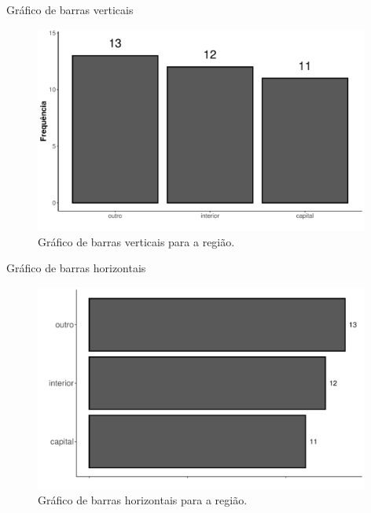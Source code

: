 \documentclass[
  ignorenonframetext,
  serif,
  professionalfont,
  usenames,
  dvipsnames,
  aspectratio = 169]{beamer}
\begin{document}
\begin{frame}{Gráfico de barras verticais}
\label{gruxe1fico-de-barras-verticais-1}
\begin{figure}

{\centering \includegraphics[width=11cm]{encontro1_files/figure-beamer/unnamed-chunk-41-1} 

}

\caption{Gráfico de barras verticais para a região.}\label{fig:unnamed-chunk-41}
\end{figure}
\end{frame}

\begin{frame}{Gráfico de barras horizontais}
\label{gruxe1fico-de-barras-horizontais}
\begin{figure}

{\centering \includegraphics[width=11cm]{encontro1_files/figure-beamer/unnamed-chunk-42-1} 

}

\caption{Gráfico de barras horizontais para a região.}\label{fig:unnamed-chunk-42}
\end{figure}
\end{frame}
\end{document}
